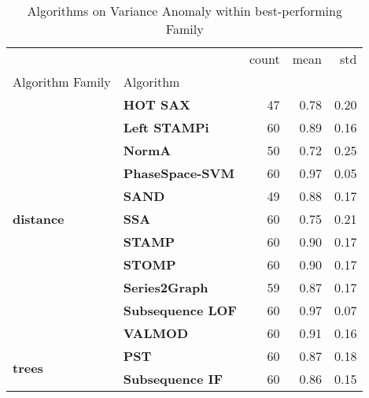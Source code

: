 \begin{table}[h]
\centering
\caption{Algorithms on Variance Anomaly within best-performing Family}
\label{tab:bp-variance}
\begin{tabular}{llrrr}
\toprule
 &  & count & mean & std \\
Algorithm Family & Algorithm &  &  &  \\
\midrule
\multirow[t]{11}{*}{\textbf{distance}} & \textbf{HOT SAX} & 47 & 0.78 & 0.20 \\
\textbf{} & \textbf{Left STAMPi} & 60 & 0.89 & 0.16 \\
\textbf{} & \textbf{NormA} & 50 & 0.72 & 0.25 \\
\textbf{} & \textbf{PhaseSpace-SVM} & 60 & 0.97 & 0.05 \\
\textbf{} & \textbf{SAND} & 49 & 0.88 & 0.17 \\
\textbf{} & \textbf{SSA} & 60 & 0.75 & 0.21 \\
\textbf{} & \textbf{STAMP} & 60 & 0.90 & 0.17 \\
\textbf{} & \textbf{STOMP} & 60 & 0.90 & 0.17 \\
\textbf{} & \textbf{Series2Graph} & 59 & 0.87 & 0.17 \\
\textbf{} & \textbf{Subsequence LOF} & 60 & 0.97 & 0.07 \\
\textbf{} & \textbf{VALMOD} & 60 & 0.91 & 0.16 \\
\cline{1-5}
\multirow[t]{2}{*}{\textbf{trees}} & \textbf{PST} & 60 & 0.87 & 0.18 \\
\textbf{} & \textbf{Subsequence IF} & 60 & 0.86 & 0.15 \\
\cline{1-5}
\bottomrule
\end{tabular}
\end{table}
